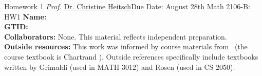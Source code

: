 \newpage{}
{Homework 1}
{\textit{Prof.} \href{https://ceheitsch.github.io/webpage/}{Dr. Christine Heitsch}}{Due Date: August 28th}
{Math 2106-B: HW1}
% 
{\large
  \noindent
  \textbf{Name:} \HandoutAuthor \smallskip \\

  \noindent
  \textbf{GTID:} \HandoutAuthorID \smallskip \\

  \noindent
  \textbf{Collaborators:} None. This material reflects independent preparation. \smallskip \\

  \noindent
  \textbf{Outside resources:} This work was informed by course materials 
  from \HandoutInstitution\ (the course textbook is 
  Chartrand \parencite{chartrand_mathematical_2018}). Outside references specifically include
  textbooks written by 
  Grimaldi \parencite{grimaldi_discrete_2004} (used in MATH 3012) and 
  Rosen \parencite{rosen_discrete_2019} (used in CS 2050). \smallskip \\
}

\newpage


% 










